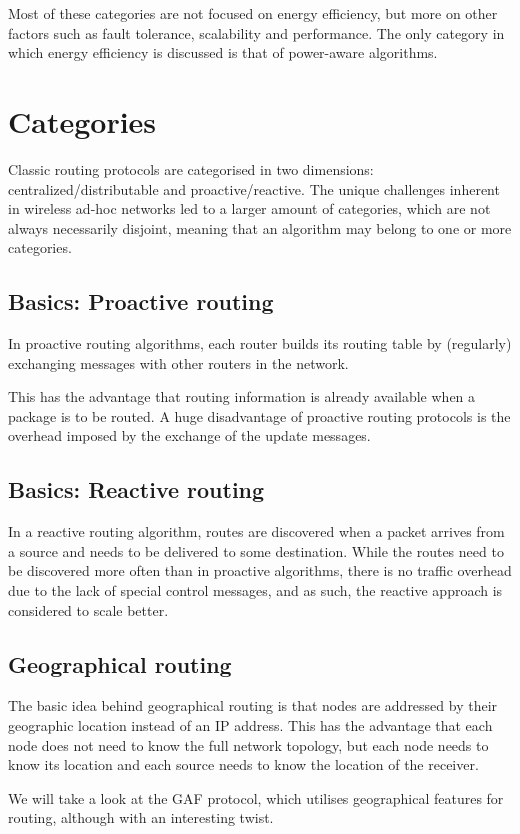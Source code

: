 \documentclass[conference]{IEEEtran}
\begin{document}
Most of these categories are not focused on energy efficiency, but more on
other factors such as fault tolerance, scalability and performance. The only
category in which energy efficiency is discussed is that of power-aware algorithms.


\section{Categories}
Classic routing protocols are categorised in two dimensions:
centralized/distributable and proactive/reactive.
The unique challenges inherent in wireless ad-hoc networks led to a larger
amount of categories, which are not always necessarily disjoint, meaning
that an algorithm may belong to one or more categories.

\subsection{Basics: Proactive routing}
In proactive routing algorithms, each router builds its routing table by
(regularly) exchanging messages with other routers in the network.

This has the advantage that routing information is already available when a
package is to be routed.
A huge disadvantage of proactive routing protocols is the overhead imposed
by the exchange of the update messages.

\subsection{Basics: Reactive routing}
In a reactive routing algorithm, routes are discovered when a packet arrives
from a source and needs to be delivered to some destination.
While the routes need to be discovered more often than in proactive algorithms,
there is no traffic overhead due to the lack of special control messages, and
as such, the reactive approach is considered to scale better.

\subsection{Geographical routing}
The basic idea behind geographical routing is that nodes are addressed by
their geographic location instead of an IP address. This has the advantage
that each node does not need to know the full network topology, but each
node needs to know its location and each source needs to know the location
of the receiver.

We will take a look at the GAF protocol, which utilises geographical
features for routing, although with an interesting twist.
\end{document}
